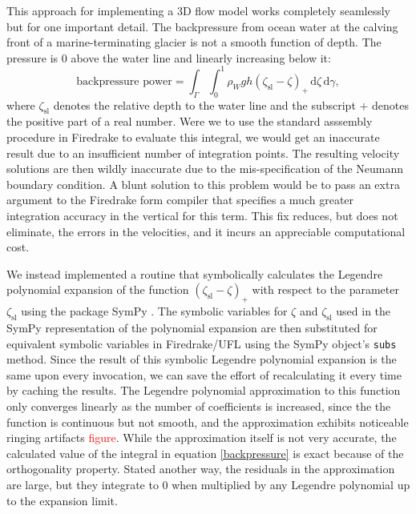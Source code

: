 \documentclass{article}
\theoremstyle{definition}
\theoremstyle{plain}
\newcommand{\ud}{\hspace{2pt}\mathrm{d}}
\begin{document}
This approach for implementing a 3D flow model works completely seamlessly but for one important detail.
The backpressure from ocean water at the calving front of a marine-terminating glacier is not a smooth function of depth.
The pressure is 0 above the water line and linearly increasing below it:
\begin{equation}
    \text{backpressure power} = \int_\Gamma\int_0^1 \rho_Wgh(\zeta_{\text{sl}} - \zeta)_+\ud\zeta\ud\gamma,
    \label{backpressure}
\end{equation}
where $\zeta_{\text{sl}}$ denotes the relative depth to the water line and the subscript $+$ denotes the positive part of a real number.
Were we to use the standard asssembly procedure in Firedrake to evaluate this integral, we would get an inaccurate result due to an insufficient number of integration points.
The resulting velocity solutions are then wildly inaccurate due to the mis-specification of the Neumann boundary condition.
A blunt solution to this problem would be to pass an extra argument to the Firedrake form compiler that specifies a much greater integration accuracy in the vertical for this term.
This fix reduces, but does not eliminate, the errors in the velocities, and it incurs an appreciable computational cost.

We instead implemented a routine that symbolically calculates the Legendre polynomial expansion of the function $(\zeta_{\text{sl}} - \zeta)_+$ with respect to the parameter $\zeta_{\text{sl}}$ using the package SymPy \citep{sympy}.
The symbolic variables for $\zeta$ and $\zeta_{\text{sl}}$ used in the SymPy representation of the polynomial expansion are then substituted for equivalent symbolic variables in Firedrake/UFL using the SymPy object's \texttt{subs} method.
Since the result of this symbolic Legendre polynomial expansion is the same upon every invocation, we can save the effort of recalculating it every time by caching the results.
The Legendre polynomial approximation to this function only converges linearly as the number of coefficients is increased, since the the function is continuous but not smooth, and the approximation exhibits noticeable ringing artifacts \textcolor{red}{figure}.
While the approximation itself is not very accurate, the calculated value of the integral in equation \eqref{backpressure} is exact because of the orthogonality property.
Stated another way, the residuals in the approximation are large, but they integrate to 0 when multiplied by any Legendre polynomial up to the expansion limit.
\end{document}

